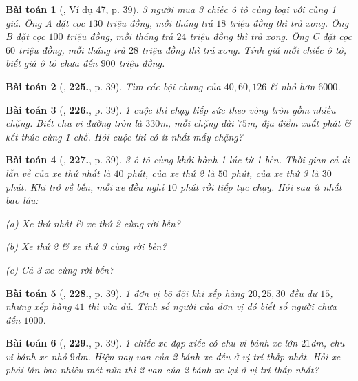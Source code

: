 \documentclass{article}
\numberwithin{equation}{section}
\newtheorem{baitoan}{Bài toán}[section]
\begin{document}
\begin{baitoan}[\cite{Binh_Toan_6_tap_1}, Ví dụ 47, p. 39]
	3 người mua 3 chiếc ô tô cùng loại với cùng 1 giá. Ông A đặt cọc $130$ triệu đồng, mỗi tháng trả $18$ triệu đồng thì trả xong. Ông B đặt cọc $100$ triệu đồng, mỗi tháng trả $24$ triệu đồng thì trả xong. Ông C đặt cọc $60$ triệu đồng, mỗi tháng trả $28$ triệu đồng thì trả xong. Tính giá mỗi chiếc ô tô, biết giá ô tô chưa đến $900$ triệu đồng.
\end{baitoan}

\begin{baitoan}[\cite{Binh_Toan_6_tap_1}, \textbf{225.}, p. 39]
	Tìm các bội chung của $40,60,126$ \& nhỏ hơn $6000$.
\end{baitoan}

\begin{baitoan}[\cite{Binh_Toan_6_tap_1}, \textbf{226.}, p. 39]
	1 cuộc thi chạy tiếp sức theo vòng tròn gồm nhiều chặng. Biết chu vi đường tròn là $330$\emph{m}, mỗi chặng dài $75$\emph{m}, địa điểm xuất phát \& kết thúc cùng 1 chỗ. Hỏi cuộc thi có ít nhất mấy chặng?
\end{baitoan}

\begin{baitoan}[\cite{Binh_Toan_6_tap_1}, \textbf{227.}, p. 39]
	3 ô tô cùng khởi hành 1 lúc từ 1 bến. Thời gian cả đi lẫn về của xe thứ nhất là $40$ phút, của xe thứ 2 là $50$ phút, của xe thứ 3 là $30$ phút. Khi trở về bến, mỗi xe đều nghỉ $10$ phút rồi tiếp tục chạy. Hỏi sau ít nhất bao lâu:
	\begin{enumerate*}
		\item[(a)] Xe thứ nhất \& xe thứ 2 cùng rời bến?
		\item[(b)] Xe thứ 2 \& xe thứ 3 cùng rời bến?
		\item[(c)] Cả 3 xe cùng rời bến?
	\end{enumerate*}
\end{baitoan}

\begin{baitoan}[\cite{Binh_Toan_6_tap_1}, \textbf{228.}, p. 39]
	1 đơn vị bộ đội khi xếp hàng $20,25,30$ đều dư $15$, nhưng xếp hàng $41$ thì vừa đủ. Tính số người của đơn vị đó biết số người chưa đến $1000$.
\end{baitoan}

\begin{baitoan}[\cite{Binh_Toan_6_tap_1}, \textbf{229.}, p. 39]
	1 chiếc xe đạp xiếc có chu vi bánh xe lớn $21$\emph{dm}, chu vi bánh xe nhỏ $9$\emph{dm}. Hiện nay van của 2 bánh xe đều ở vị trí thấp nhất. Hỏi xe phải lăn bao nhiêu mét nữa thì 2 van của 2 bánh xe lại ở vị trí thấp nhất?
\end{baitoan}
\end{document}
